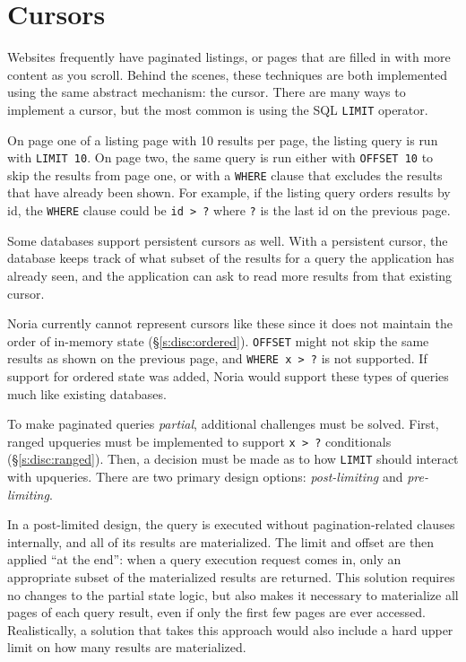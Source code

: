 \section{Cursors}

Websites frequently have paginated listings, or pages that are filled in with
more content as you scroll. Behind the scenes, these techniques are both
implemented using the same abstract mechanism: the cursor. There are many ways to
implement a cursor, but the most common is using the SQL \texttt{LIMIT}
operator.

On page one of a listing page with 10 results per page, the listing query is run
with \texttt{LIMIT 10}. On page two, the same query is run either with
\texttt{OFFSET 10} to skip the results from page one, or with a \texttt{WHERE}
clause that excludes the results that have already been shown. For example, if
the listing query orders results by id, the \texttt{WHERE} clause could be
\texttt{id > ?} where \texttt{?} is the last id on the previous page.

Some databases support persistent cursors as well. With a persistent cursor, the
database keeps track of what subset of the results for a query the application
has already seen, and the application can ask to read more results from that
existing cursor.

Noria currently cannot represent cursors like these since it does not maintain
the order of in-memory state (\S\ref{s:disc:ordered}). \texttt{OFFSET} might not
skip the same results as shown on the previous page, and \texttt{WHERE x > ?} is
not supported. If support for ordered state was added, Noria would support these
types of queries much like existing databases.

To make paginated queries \emph{partial}, additional challenges must be solved.
First, ranged upqueries must be implemented to support \texttt{x > ?}
conditionals (\S\ref{s:disc:ranged}). Then, a decision must be made as to how
\texttt{LIMIT} should interact with upqueries. There are two primary design
options: \emph{post-limiting} and \emph{pre-limiting}.

In a post-limited design, the query is executed without pagination-related
clauses internally, and all of its results are materialized. The limit and
offset are then applied ``at the end'': when a query execution request comes in,
only an appropriate subset of the materialized results are returned. This
solution requires no changes to the partial state logic, but also makes it
necessary to materialize all pages of each query result, even if only the first
few pages are ever accessed. Realistically, a solution that takes this approach
would also include a hard upper limit on how many results are materialized.

